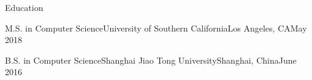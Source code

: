 \documentclass{resume} %
\begin{document}




\begin{rSection}{Education}

\begin{rEducation}{M.S. in Computer Science}{University of Southern California}{Los Angeles, CA}{May 2018}
\end{rEducation}

\begin{rEducation}{B.S. in Computer Science}{Shanghai Jiao Tong University}{Shanghai, China}{June 2016}
\end{rEducation}

\end{rSection}


%


%




\end{document}
